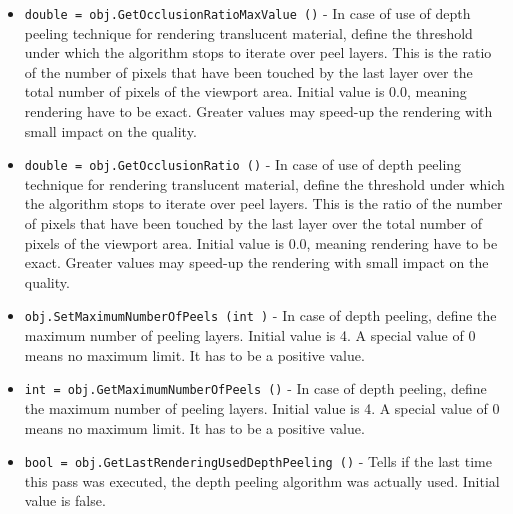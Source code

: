\begin{itemize}
\item  \verb|double = obj.GetOcclusionRatioMaxValue ()| -  In case of use of depth peeling technique for rendering translucent
 material, define the threshold under which the algorithm stops to
 iterate over peel layers. This is the ratio of the number of pixels
 that have been touched by the last layer over the total number of pixels
 of the viewport area.
 Initial value is 0.0, meaning rendering have to be exact. Greater values
 may speed-up the rendering with small impact on the quality.

\item  \verb|double = obj.GetOcclusionRatio ()| -  In case of use of depth peeling technique for rendering translucent
 material, define the threshold under which the algorithm stops to
 iterate over peel layers. This is the ratio of the number of pixels
 that have been touched by the last layer over the total number of pixels
 of the viewport area.
 Initial value is 0.0, meaning rendering have to be exact. Greater values
 may speed-up the rendering with small impact on the quality.

\item  \verb|obj.SetMaximumNumberOfPeels (int )| -  In case of depth peeling, define the maximum number of peeling layers.
 Initial value is 4. A special value of 0 means no maximum limit.
 It has to be a positive value.

\item  \verb|int = obj.GetMaximumNumberOfPeels ()| -  In case of depth peeling, define the maximum number of peeling layers.
 Initial value is 4. A special value of 0 means no maximum limit.
 It has to be a positive value.

\item  \verb|bool = obj.GetLastRenderingUsedDepthPeeling ()| -  Tells if the last time this pass was executed, the depth peeling
 algorithm was actually used. Initial value is false.

\end{itemize}

